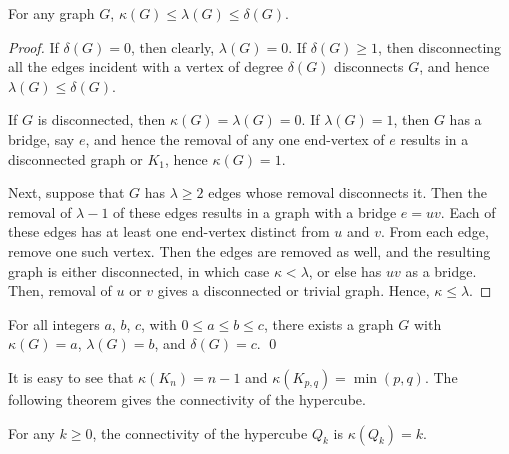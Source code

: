 \begin{Theorem}\label{thm:ConnectivityBounds}
For any graph $G$, $\kappa(G) \le \lambda(G) \le \delta(G)$.
\end{Theorem}

\begin{proof}
If $\delta(G) = 0$, then clearly, $\lambda(G) = 0$. If $\delta(G) \ge 1$, then disconnecting all the edges incident with a vertex of degree $\delta(G)$ disconnects $G$, and hence $\lambda(G) \le \delta(G)$.

If $G$ is disconnected, then $\kappa(G) = \lambda(G) = 0$. If $\lambda(G) = 1$, then $G$ has a bridge, say $e$, and hence the removal of any one end-vertex of $e$ results in a disconnected graph or $K_1$, hence $\kappa(G) = 1$.

Next, suppose that $G$ has $\lambda \ge 2$ edges whose removal disconnects it. Then the removal of $\lambda - 1$ of these edges results in a graph with a bridge $e = uv$. Each of these edges has at least one end-vertex distinct from $u$ and $v$. From each edge, remove one such vertex. Then the edges are removed as well, and the resulting graph is either disconnected, in which case $\kappa < \lambda$, or else has $uv$ as a bridge. Then, removal of $u$ or $v$ gives a disconnected or trivial graph. Hence, $\kappa \le \lambda$.
\end{proof}

\begin{Theorem}
For all integers $a$, $b$, $c$, with $0 \le a \le b \le c$, there exists a graph $G$ with $\kappa(G) = a$, $\lambda(G) = b$, and $\delta(G) = c$. \qed
\end{Theorem}

It is easy to see that $\kappa(K_n) = n -1$ and $\kappa(K_{p,q}) = \min(p, q)$. The following theorem gives the connectivity of the hypercube.

\begin{Theorem}
For any $k \ge 0$, the connectivity of the hypercube $Q_k$ is $\kappa(Q_k) = k$.
\end{Theorem}

